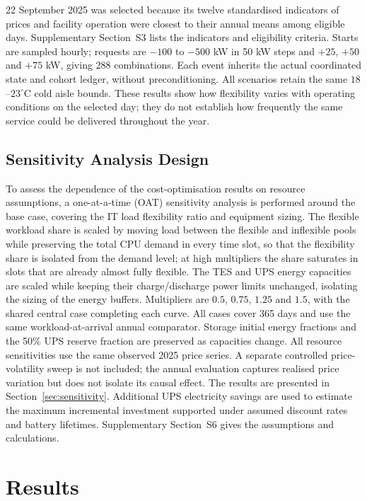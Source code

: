 \documentclass[lettersize,journal]{IEEEtran}
\newcommand{\rev}[1]{#1}
\begin{document}
22 September 2025 was selected because its twelve standardised indicators of prices and facility operation were closest to their annual means among eligible days. Supplementary Section~S3 lists the indicators and eligibility criteria. Starts are sampled hourly; requests are $-100$ to $-500$ kW in 50 kW steps and $+25$, $+50$ and $+75$ kW, giving 288 combinations. Each event inherits the actual coordinated state and cohort ledger, without preconditioning. All scenarios retain the same $18$--$23^\circ$C cold aisle bounds. These results show how flexibility varies with operating conditions on the selected day; they do not establish how frequently the same service could be delivered throughout the year.

\subsection{\rev{Sensitivity Analysis Design}}\label{sec:sensitivity-design}
\rev{To assess the dependence of the cost-optimisation results on resource assumptions, a one-at-a-time (OAT) sensitivity analysis is performed around the base case, covering the IT load flexibility ratio and equipment sizing. The flexible workload share is scaled by moving load between the flexible and inflexible pools while preserving the total CPU demand in every time slot, so that the flexibility share is isolated from the demand level; at high multipliers the share saturates in slots that are already almost fully flexible. The TES and UPS energy capacities are scaled while keeping their charge/discharge power limits unchanged, isolating the sizing of the energy buffers. Multipliers are $0.5$, $0.75$, $1.25$ and $1.5$, with the shared central case completing each curve. All cases cover 365 days and use the same workload-at-arrival annual comparator. Storage initial energy fractions and the 50\% UPS reserve fraction are preserved as capacities change. All resource sensitivities use the same observed 2025 price series. A separate controlled price-volatility sweep is not included; the annual evaluation captures realised price variation but does not isolate its causal effect. The results are presented in Section~\ref{sec:sensitivity}.} Additional UPS electricity savings are used to estimate the maximum incremental investment supported under assumed discount rates and battery lifetimes. Supplementary Section~S6 gives the assumptions and calculations.
\section{Results}\label{sec:results}
\end{document}
